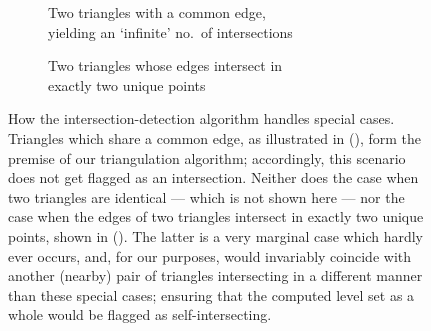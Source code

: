 \begin{figure}[htpb]
    \centering
    \begin{subfigure}[b]{0.45\textwidth}
        \centering
        \resizebox{0.9\textwidth}{!}{}
        \caption[]{Two triangles with a common edge,\\\phantom{(a) } yielding
        an `infinite' no.\ of intersections}
        \label{fig:mollertrumbore_vertexshared}
    \end{subfigure}
    \begin{subfigure}[b]{0.45\textwidth}
        \centering
        \resizebox{0.9\textwidth}{!}{}
        \caption[]{Two triangles whose edges intersect in\\\phantom{(b) } exactly
            two unique points
        }
        \label{fig:mollertrumbore_dualisect}
    \end{subfigure}
    \caption[How the intersection-detection algorithm handles special cases]
    {How the intersection-detection algorithm handles special cases.
        Triangles which share a common edge, as illustrated in
        (), form the premise of our
        triangulation algorithm; accordingly, this scenario does not get flagged
        as an intersection. Neither does the case when two triangles are
        identical --- which is not shown here --- nor the case when the edges of
        two triangles intersect in exactly two unique points, shown in
        (). The latter is a very marginal
        case which hardly ever occurs, and, for our purposes, would invariably
        coincide with another (nearby) pair of triangles intersecting in a
        different manner than these special cases; ensuring that the computed
        level set as a whole would be flagged as self-intersecting.}
    \label{fig:mollertrumbore_specialcases}
\end{figure}

